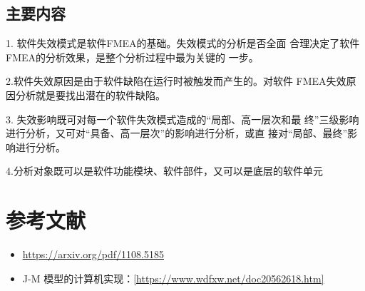 \subsection{主要内容}

1. 软件失效模式是软件FMEA的基础。失效模式的分析是否全面
合理决定了软件FMEA的分析效果，是整个分析过程中最为关键的
一步。

2.软件失效原因是由于软件缺陷在运行时被触发而产生的。对软件
FMEA失效原因分析就是要找出潜在的软件缺陷。

3. 失效影响既可对每一个软件失效模式造成的“局部、高一层次和最
终”三级影响进行分析，又可对“具备、高一层次”的影响进行分析，或直
接对“局部、最终”影响进行分析。

4.分析对象既可以是软件功能模块、软件部件，又可以是底层的软件单元

\section{参考文献}

\begin{itemize}
    \item \href{https://arxiv.org/pdf/1108.5185}{\underline{https://arxiv.org/pdf/1108.5185}}
    \item J-M 模型的计算机实现：\href{https://www.wdfxw.net/doc20562618.htm}{\underline[https://www.wdfxw.net/doc20562618.htm]}
\end{itemize}

